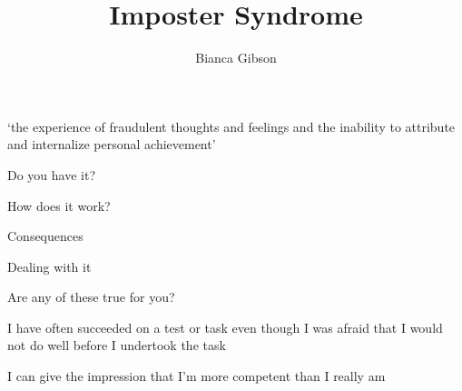 \documentclass[aspectratio=169]{beamer}
\title{Imposter Syndrome}
\author{Bianca Gibson}
\institute{Pycon AU 2016}
\date{}
\begin{document}
\frame{\titlepage}

\begin{frame}
  \begin{center}
    \Huge `the experience of fraudulent thoughts and feelings and the inability to attribute and internalize personal achievement'
    \\ \small \cite{hh15}
  \end{center}
\end{frame}

\begin{frame}
  \begin{center}
    \Huge Do you have it?
  \end{center}
\end{frame}

\begin{frame}
  \begin{center}
    \Huge How does it work?
  \end{center}
\end{frame}

\begin{frame}
  \begin{center}
    \Huge Consequences
  \end{center}
\end{frame}

\begin{frame}
  \begin{center}
    \Huge Dealing with it
  \end{center}
\end{frame}

\begin{frame}
  \begin{center}
    \Huge Are any of these true for you?
    \\ \small \cite{clance85}
  \end{center}
\end{frame}

\begin{frame}
  \begin{center}
    \Huge  I have often succeeded on a test or task even though I was afraid that I would not do well before I undertook the task
  \end{center}
\end{frame}

\begin{frame}
  \begin{center}
    \Huge  I can give the impression that I’m more competent than I really am
  \end{center}
\end{frame}
\end{document}
